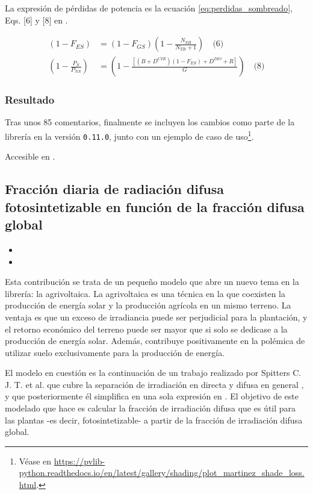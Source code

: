 La expresión de pérdidas de potencia es la ecuación \ref{eq:perdidas_sombreado}, Eqs. [6] y [8] en \cite{Martínez-Moreno_Muñoz_Lorenzo_2010}.

\begin{equation*} \label{eq:perdidas_sombreado}
\begin{split}
    (1 - F_{ES}) &= (1 - F_{GS}) \left(1 - \frac{N_{SB}}{N_{TB} + 1}\right) \quad \text{(6)}\\
    \left(1 - \frac{P_{S}}{P_{NS}}\right) &= \left(1 - \frac{\left[(B + D^{CIR})(1 - F_{ES}) + D^{ISO} + R\right]}{G}\right) \quad \text{(8)}
\end{split}
\end{equation*}

\subsubsection{Resultado}

Tras unos 85 comentarios, finalmente se incluyen los cambios como parte de la librería en la versión \texttt{0.11.0}, junto con un ejemplo de caso de uso\footnote{Véase en \url{https://pvlib-python.readthedocs.io/en/latest/gallery/shading/plot_martinez_shade_loss.html}.}.

Accesible en .

\subsection{Fracción diaria de radiación difusa fotosintetizable en función de la fracción difusa global}

\begin{itemize}
    \item {}
    \item {}
\end{itemize}

Esta contribución se trata de un pequeño modelo que abre un nuevo tema en la librería: la agrivoltaica. La agrivoltaica es una técnica en la que coexisten la producción de energía solar y la producción agrícola en un mismo terreno. La ventaja es que un exceso de irradiancia puede ser perjudicial para la plantación, y el retorno económico del terreno puede ser mayor que si solo se dedicase a la producción de energía solar. Además, contribuye positivamente en la polémica de utilizar suelo exclusivamente para la producción de energía.

El modelo en cuestión es la continuación de un trabajo realizado por Spitters C. J. T. et al. que cubre la separación de irradiación en directa y difusa en general \cite{Spitters_Toussaint_Goudriaan_1986}, y que posteriormente él simplifica en una sola expresión en \cite{Spitters_1986}. El objetivo de este modelado que hace es calcular la fracción de irradiación difusa que es útil para las plantas -es decir, fotosintetizable- a partir de la fracción de irradiación difusa global.

